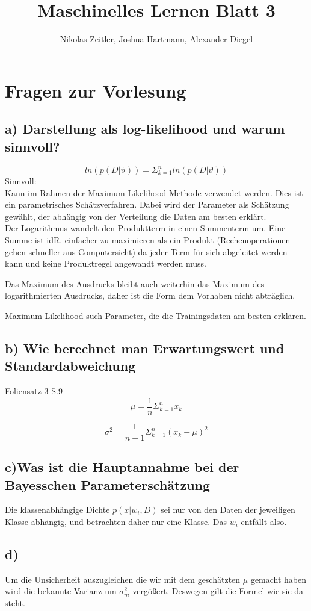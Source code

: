 \documentclass{scrartcl}
\author{Nikolas Zeitler, Joshua Hartmann, Alexander Diegel}
\title{Maschinelles Lernen Blatt 3}
\begin{document}
\maketitle
\section{Fragen zur Vorlesung}
\subsection*{a) Darstellung als log-likelihood und warum sinnvoll?}
\[ ln (p(D|\vartheta)) = \Sigma^n_{k=1} ln (p(D|\vartheta)) \]
Sinnvoll: \\
Kann im Rahmen der Maximum-Likelihood-Methode verwendet werden. Dies ist ein parametrisches Schätzverfahren. Dabei wird der Parameter als Schätzung gewählt, der abhängig von der Verteilung die Daten am besten erklärt.\\
Der Logarithmus wandelt den Produktterm in einen Summenterm um. Eine Summe ist idR. einfacher zu maximieren 
als ein Produkt (Rechenoperationen gehen schneller aus Computersicht) da jeder Term für sich abgeleitet werden kann und keine Produktregel angewandt werden muss.

Das Maximum des Ausdrucks bleibt auch weiterhin das Maximum des logarithmierten Ausdrucks, daher ist die Form dem Vorhaben nicht abträglich. 

Maximum Likelihood such Parameter, die die Trainingsdaten am besten erklären.
\subsection*{b) Wie berechnet man Erwartungswert und Standardabweichung}
Foliensatz 3 S.9 \\
\[\mu = \frac{1}{n}\Sigma^n_{k=1}x_k \]

\[\sigma^2 = \frac{1}{n-1}\Sigma^n_{k=1}(x_k-\mu)^2 \]

\subsection*{c)Was ist die Hauptannahme bei der Bayesschen Parameterschätzung}
Die klassenabhängige Dichte $p(x|w_i,D)$ sei nur von den Daten der jeweiligen Klasse abhängig, und betrachten daher nur eine Klasse. Das $w_i$ entfällt also.
\subsection*{d)}
Um die Unsicherheit auszugleichen die wir mit dem geschätzten $\mu$ gemacht haben wird die bekannte Varianz um $\sigma_m^2$ vergößert. Deswegen gilt die Formel wie sie da steht.
\end{document}
